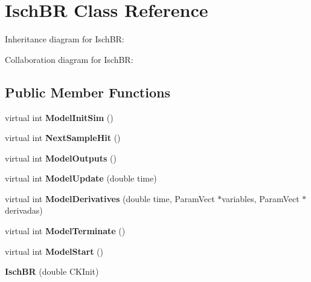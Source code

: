 \hypertarget{classIschBR}{}\section{Isch\+BR Class Reference}
\label{classIschBR}


Inheritance diagram for Isch\+BR\+:


Collaboration diagram for Isch\+BR\+:
\subsection*{Public Member Functions}
\begin{DoxyCompactItemize}
\item 
virtual int {\bfseries Model\+Init\+Sim} ()\hypertarget{classIschBR_a1da2bd60610dab2ad3a0f524ecdcc93f}{}\label{classIschBR_a1da2bd60610dab2ad3a0f524ecdcc93f}

\item 
virtual int {\bfseries Next\+Sample\+Hit} ()\hypertarget{classIschBR_a43e78223bb7fe84f578f67844ea55526}{}\label{classIschBR_a43e78223bb7fe84f578f67844ea55526}

\item 
virtual int {\bfseries Model\+Outputs} ()\hypertarget{classIschBR_aae253b500abb8d799d21fe80f83659a9}{}\label{classIschBR_aae253b500abb8d799d21fe80f83659a9}

\item 
virtual int {\bfseries Model\+Update} (double time)\hypertarget{classIschBR_a5888c713c006ebaa96f1263b857f1916}{}\label{classIschBR_a5888c713c006ebaa96f1263b857f1916}

\item 
virtual int {\bfseries Model\+Derivatives} (double time, Param\+Vect $\ast$variables, Param\+Vect $\ast$derivadas)\hypertarget{classIschBR_a4a0b7f7beac283d32a0c28834bf055b7}{}\label{classIschBR_a4a0b7f7beac283d32a0c28834bf055b7}

\item 
virtual int {\bfseries Model\+Terminate} ()\hypertarget{classIschBR_acd0976b7d63c8cd6a2f53cacc01d42f2}{}\label{classIschBR_acd0976b7d63c8cd6a2f53cacc01d42f2}

\item 
virtual int {\bfseries Model\+Start} ()\hypertarget{classIschBR_a7c9a341762130f0ea86a4bd3cec29c72}{}\label{classIschBR_a7c9a341762130f0ea86a4bd3cec29c72}

\item 
{\bfseries Isch\+BR} (double C\+K\+Init)\hypertarget{classIschBR_a731b7f6caaccf2c3cd38ca43a9653cad}{}\label{classIschBR_a731b7f6caaccf2c3cd38ca43a9653cad}


\end{DoxyCompactItemize}
